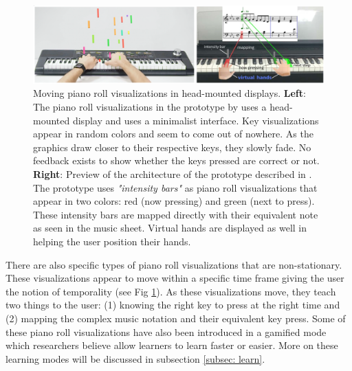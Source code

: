 \documentclass[manuscript,screen]{acmart}
\begin{document}
\begin{figure}[t]
    \centering
    \includegraphics[width=15cm]{figures/caitrujano.png}
    \caption{Moving piano roll visualizations in head-mounted displays. \textbf{Left}: The piano roll visualizations in the prototype by  \cite{trujano2018arpiano} uses a head-mounted display and uses a minimalist interface. Key visualizations appear in random colors and seem to come out of nowhere. As the graphics draw closer to their respective keys, they slowly fade. No feedback exists to show whether the keys pressed are correct or not.  \textbf{Right}: Preview of the architecture of the prototype described in \cite{cai2019design}. The prototype uses \textit{"intensity bars"} as piano roll visualizations that appear in two colors: red (now pressing) and green (next to press). These intensity bars are mapped directly with their equivalent note as seen in the music sheet. Virtual hands are displayed as well in helping the user position their hands. }
    \label{fig:caitrujano}
\end{figure}

There are also specific types of piano roll visualizations that are non-stationary. These visualizations appear to move within a specific time frame giving the user the notion of temporality (see Fig \ref{fig:caitrujano}). As these visualizations move, they teach two things to the user: (1) knowing the right key to press at the right time and (2) mapping the complex music notation and their equivalent key press. Some of these piano roll visualizations have also been introduced in a gamified mode \cite{Weing:2013:PEI:2494091.2494113} which researchers believe allow learners to learn faster or easier. More on these learning modes will be discussed in subsection \ref{subsec: learn}. 

\end{document}
